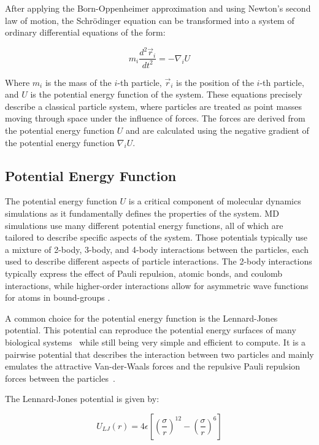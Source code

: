 After applying the Born-Oppenheimer approximation and using Newton's second law of motion, the Schrödinger equation can be transformed into a system of ordinary differential equations of the form:

\begin{equation}
      m_i \frac{d^2 \vec{r}_i}{dt^2} = -\nabla_i U
\end{equation}

Where $m_i$ is the mass of the $i$-th particle, $\vec{r}_i$ is the position of the $i$-th particle, and $U$ is the potential energy function of the system. These equations precisely describe a classical particle system, where particles are treated as point masses moving through space under the influence of forces. The forces are derived from the potential energy function $U$ and are calculated using the negative gradient of the potential energy function $\nabla_i U$.

\subsection{Potential Energy Function}

The potential energy function $U$ is a critical component of molecular dynamics simulations as it fundamentally defines the properties of the system. MD simulations use many different potential energy functions, all of which are tailored to describe specific aspects of the system. Those potentials typically use a mixture of 2-body, 3-body, and 4-body interactions between the particles, each used to describe different aspects of particle interactions. The 2-body interactions typically express the effect of Pauli repulsion, atomic bonds, and coulomb interactions, while higher-order interactions allow for asymmetric wave functions for atoms in bound-groups \cite{Leimkuhler2015}.

A common choice for the potential energy function is the Lennard-Jones potential. This potential can reproduce the potential energy surfaces of many biological systems~\cite{NexusPhysicsLennardJones} while still being very simple and efficient to compute. It is a pairwise potential that describes the interaction between two particles and mainly emulates the attractive Van-der-Waals forces and the repulsive Pauli repulsion forces between the particles~\cite{ChemieLexikonLennardJones}.

The Lennard-Jones potential is given by:

\begin{equation}
      U_{LJ}(r) = 4 \epsilon \left[ \left( \frac{\sigma}{r} \right)^{12} - \left( \frac{\sigma}{r} \right)^6 \right]
\end{equation}


